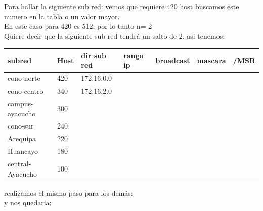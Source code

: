 \begin{landscape}
Para hallar la siguiente sub red: vemos que requiere 420 host buscamos este numero en la tabla o un valor mayor.
\\
En este caso para 420 es 512; por lo tanto n= 2\\
Quiere decir que la siguiente sub red tendr\'a un salto de 2, asi tenemos:



\begin{table}[htbp]
\begin{tabular}{|l|l|l|l|l|l|l|}
\hline
\rowcolor[HTML]{32CB00} 
\textbf{subred}  & Host & \textbf{dir sub red} & \textbf{rango ip} & \textbf{broadcast} & \textbf{mascara} & \textbf{/MSR} \\ \hline
cono-norte       & 420  & 172.16.0.0           &                   &                    &                  &               \\ \hline
cono-centro      & 340  & 172.16.2.0           &                   &                    &                  &               \\ \hline
campus-ayacucho  & 300  &                      &                   &                    &                  &               \\ \hline
cono-sur         & 240  &                      &                   &                    &                  &               \\ \hline
Arequipa         & 220  &                      &                   &                    &                  &               \\ \hline
Huancayo         & 180  &                      &                   &                    &                  &               \\ \hline
central-Ayacucho & 100  &                      &                   &                    &                  &               \\ \hline
\end{tabular}
\end{table}


realizamos el mismo paso para los dem\'as:\\
y nos quedaria:



\end{landscape}
